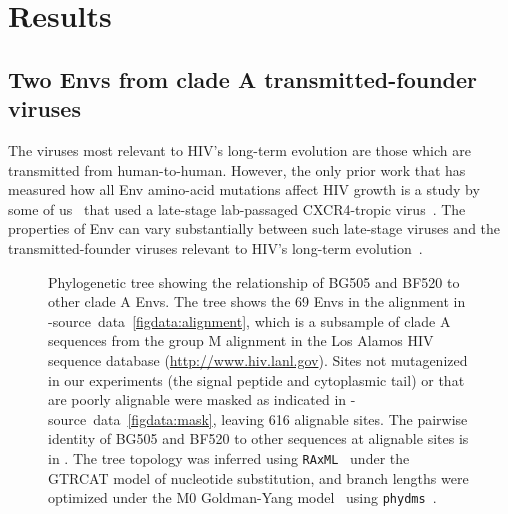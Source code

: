 \documentclass[9pt]{elife}
\begin{document}
\section{Results}

\subsection{Two Envs from clade A transmitted-founder viruses}
The viruses most relevant to HIV's long-term evolution are those which are transmitted from human-to-human.
However, the only prior work that has measured how all Env amino-acid mutations affect HIV growth is a study by some of us~\citep{haddox2016experimental} that used a late-stage lab-passaged CXCR4-tropic virus~\citep[LAI;][]{peden1991changes}.
The properties of Env can vary substantially between such late-stage viruses and the transmitted-founder viruses relevant to HIV's long-term evolution~\citep{sagar2006human,wilen2011phenotypic,parrish2013phenotypic,ronen2015hiv}.

\begin{figure}
\caption{\label{fig:tree}
Phylogenetic tree showing the relationship of BG505 and BF520 to other clade A Envs.
The tree shows the 69 Envs in the alignment in -source~data~\ref{figdata:alignment}, which is a subsample of clade A sequences from the group M alignment in the Los Alamos HIV sequence database (\url{http://www.hiv.lanl.gov}).
Sites not mutagenized in our experiments (the signal peptide and cytoplasmic tail) or that are poorly alignable were masked as indicated in -source~data~\ref{figdata:mask}, leaving 616 alignable sites.
The pairwise identity of BG505 and BF520 to other sequences at alignable sites is in .
The tree topology was inferred using \texttt{RAxML}~\citep{stamatakis2014raxml} under the GTRCAT model of nucleotide substitution, and branch lengths were optimized under the M0 Goldman-Yang model~\citep{yang2000codon} using \texttt{phydms}~\citep{hilton2017phydms}.
}
{}
\end{figure}
\end{document}
